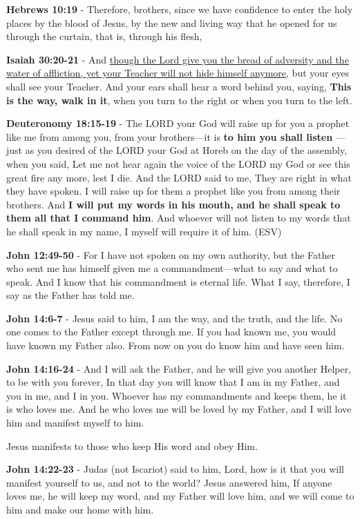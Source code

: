 \documentclass[11pt]{article}
\begin{document}
\textbf{Hebrews 10:19} - Therefore, brothers, since we have confidence to enter the holy places by the blood of Jesus, by the new and living way that he opened for us through the curtain, that is, through his flesh,

\textbf{Isaiah 30:20-21} - And \uline{though the Lord give you the bread of adversity and the water of affliction, yet your Teacher will not hide himself anymore}, but your eyes shall see your Teacher. And your ears shall hear a word behind you, saying, \textbf{This is the way, walk in it}, when you turn to the right or when you turn to the left.

\textbf{Deuteronomy 18:15-19} - The LORD your God will raise up for you a prophet like me from among you, from your brothers—it is \textbf{to him you shall listen} — just as you desired of the LORD your God at Horeb on the day of the assembly, when you said, Let me not hear again the voice of the LORD my God or see this great fire any more, lest I die. And the LORD said to me, They are right in what they have spoken. I will raise up for them a prophet like you from among their brothers. And \textbf{I will put my words in his mouth, and he shall speak to them all that I command him}. And whoever will not listen to my words that he shall speak in my name, I myself will require it of him. (ESV)

\textbf{John 12:49-50} - For I have not spoken on my own authority, but the Father who sent me has himself given me a commandment—what to say and what to speak. And I know that his commandment is eternal life. What I say, therefore, I say as the Father has told me.

\textbf{John 14:6-7} - Jesus said to him, I am the way, and the truth, and the life. No one comes to the Father except through me. If you had known me, you would have known my Father also. From now on you do know him and have seen him.

\textbf{John 14:16-24} - And I will ask the Father, and he will give you another Helper, to be with you forever, In that day you will know that I am in my Father, and you in me, and I in you. Whoever has my commandments and keeps them, he it is who loves me. And he who loves me will be loved by my Father, and I will love him and manifest myself to him.

Jesus manifests to those who keep His word and obey Him.

\textbf{John 14:22-23} - Judas (not Iscariot) said to him, Lord, how is it that you will manifest yourself to us, and not to the world? Jesus answered him, If anyone loves me, he will keep my word, and my Father will love him, and we will come to him and make our home with him.
\end{document}
